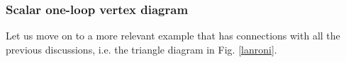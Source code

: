 \documentclass[%
 reprint,
 amsmath,amssymb,
 aps,
]{revtex4-1}
\begin{document}

\subsubsection{Scalar one-loop vertex diagram}

Let us move on to a more relevant example that has connections with all the previous discussions, i.e. the triangle diagram in Fig. \ref{lanroni}.
\end{document}
